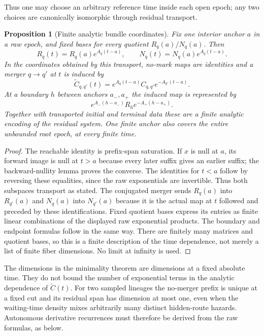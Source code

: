 \documentclass[11pt]{article}
\newtheorem{proposition}[theorem]{Proposition}
\begin{document}
Thus one may choose an arbitrary reference time inside each open epoch; any two choices are canonically isomorphic through residual transport.

\begin{proposition}[Finite analytic bundle coordinates]
\label{prop:supp-bundle}
Fix one interior anchor $a$ in a raw epoch, and fixed bases for every quotient $R_q(a)/N_q(a)$.  Then
\[
R_q(t)=R_q(a)e^{A_q(t-a)},\qquad
N_q(t)=N_q(a)e^{A_q(t-a)}.
\]
In the coordinates obtained by this transport, no-mark maps are identities and a merger $q\to q'$ at $t$ is induced by
\[
\widetilde C_{q,q'}(t)=e^{A_q(t-a)}C_{q,q'}e^{-A_{q'}(t-a)}.
\]
At a boundary $h$ between anchors $a_-,a_+$ the induced map is represented by
\[
e^{A_-(h-a_-)}R_he^{-A_+(h-a_+)}.
\]
Together with transported initial and terminal data these are a finite analytic encoding of the residual system.  One finite anchor also covers the entire unbounded root epoch, at every finite time.
\end{proposition}

\begin{proof}
The reachable identity is prefix-span saturation.  If $x$ is null at $a$, its forward image is null at $t>a$ because every later suffix gives an earlier suffix; the backward-nullity lemma proves the converse.  The identities for $t<a$ follow by reversing these equalities, since the raw exponentials are invertible.  Thus both subspaces transport as stated.  The conjugated merger sends $R_q(a)$ into $R_{q'}(a)$ and $N_q(a)$ into $N_{q'}(a)$ because it is the actual map at $t$ followed and preceded by these identifications.  Fixed quotient bases express its entries as finite linear combinations of the displayed raw exponential products.  The boundary and endpoint formulas follow in the same way.  There are finitely many matrices and quotient bases, so this is a finite description of the time dependence, not merely a list of finite fiber dimensions.  No limit at infinity is used.
\end{proof}

The dimensions in the minimality theorem are dimensions at a fixed absolute time.  They do not bound the number of exponential terms in the analytic dependence of $\widetilde C(t)$.  For two sampled lineages the no-merger prefix is unique at a fixed cut and its residual span has dimension at most one, even when the waiting-time density mixes arbitrarily many distinct hidden-route hazards.  Autonomous derivative recurrences must therefore be derived from the raw formulas, as below.
\end{document}

